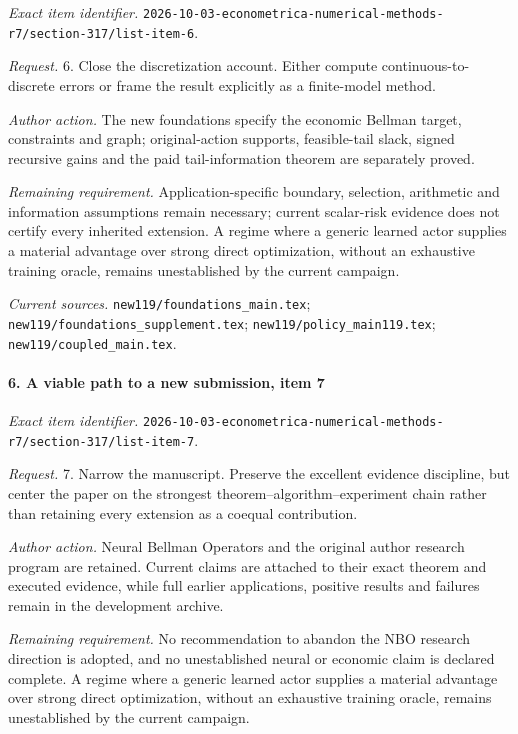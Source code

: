 \emph{Exact item identifier.} \nolinkurl{2026-10-03-econometrica-numerical-methods-r7/section-317/list-item-6}.

\par\emph{Request.} 6. Close the discretization account. Either compute continuous-to-discrete errors or frame the result explicitly as a finite-model method.

\par\emph{Author action.} The new foundations specify the economic Bellman target, constraints and graph; original-action supports, feasible-tail slack, signed recursive gains and the paid tail-information theorem are separately proved.

\par\emph{Remaining requirement.} Application-specific boundary, selection, arithmetic and information assumptions remain necessary; current scalar-risk evidence does not certify every inherited extension. A regime where a generic learned actor supplies a material advantage over strong direct optimization, without an exhaustive training oracle, remains unestablished by the current campaign.

\par\emph{Current sources.} \nolinkurl{new119/foundations_main.tex}; \nolinkurl{new119/foundations_supplement.tex}; \nolinkurl{new119/policy_main119.tex}; \nolinkurl{new119/coupled_main.tex}.

\paragraph{6. A viable path to a new submission, item 7}

\emph{Exact item identifier.} \nolinkurl{2026-10-03-econometrica-numerical-methods-r7/section-317/list-item-7}.

\par\emph{Request.} 7. Narrow the manuscript. Preserve the excellent evidence discipline, but center the paper on the strongest theorem--algorithm--experiment chain rather than retaining every extension as a coequal contribution.

\par\emph{Author action.} Neural Bellman Operators and the original author research program are retained. Current claims are attached to their exact theorem and executed evidence, while full earlier applications, positive results and failures remain in the development archive.

\par\emph{Remaining requirement.} No recommendation to abandon the NBO research direction is adopted, and no unestablished neural or economic claim is declared complete. A regime where a generic learned actor supplies a material advantage over strong direct optimization, without an exhaustive training oracle, remains unestablished by the current campaign.


